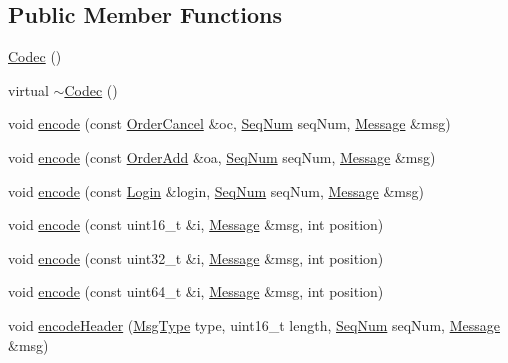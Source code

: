 \subsection*{Public Member Functions}
\begin{DoxyCompactItemize}
\item 
\hyperlink{classMetal_1_1Aquis_1_1Codec_ab68190600daa2d1b8105e6d8ff83afd6}{Codec} ()
\item 
virtual \hyperlink{classMetal_1_1Aquis_1_1Codec_a7bdeb61cbb583a2a77476cd7b196c0c2}{$\sim$\+Codec} ()
\item 
void \hyperlink{classMetal_1_1Aquis_1_1Codec_a361dc20ec705f056891468c8b0312699}{encode} (const \hyperlink{classMetal_1_1Aquis_1_1OrderCancel}{Order\+Cancel} \&oc, \hyperlink{namespaceMetal_1_1Aquis_a2e28795915a9bf76ccc4574a24376487}{Seq\+Num} seq\+Num, \hyperlink{classMetal_1_1Message}{Message} \&msg)
\item 
void \hyperlink{classMetal_1_1Aquis_1_1Codec_aaf73f35bd28f5f59ac6b2a968354bb91}{encode} (const \hyperlink{classMetal_1_1Aquis_1_1OrderAdd}{Order\+Add} \&oa, \hyperlink{namespaceMetal_1_1Aquis_a2e28795915a9bf76ccc4574a24376487}{Seq\+Num} seq\+Num, \hyperlink{classMetal_1_1Message}{Message} \&msg)
\item 
void \hyperlink{classMetal_1_1Aquis_1_1Codec_a1162f3fd1a0f6351dba465a23af0f114}{encode} (const \hyperlink{classMetal_1_1Aquis_1_1Login}{Login} \&login, \hyperlink{namespaceMetal_1_1Aquis_a2e28795915a9bf76ccc4574a24376487}{Seq\+Num} seq\+Num, \hyperlink{classMetal_1_1Message}{Message} \&msg)
\item 
void \hyperlink{classMetal_1_1Aquis_1_1Codec_a8aa920b8a5422358a2529056e36094d7}{encode} (const uint16\+\_\+t \&i, \hyperlink{classMetal_1_1Message}{Message} \&msg, int position)
\item 
void \hyperlink{classMetal_1_1Aquis_1_1Codec_a82ef20e51a8850db3213c60a9348b59e}{encode} (const uint32\+\_\+t \&i, \hyperlink{classMetal_1_1Message}{Message} \&msg, int position)
\item 
void \hyperlink{classMetal_1_1Aquis_1_1Codec_abd44b89febe2913fbe8505653ce17cb4}{encode} (const uint64\+\_\+t \&i, \hyperlink{classMetal_1_1Message}{Message} \&msg, int position)
\item 
void \hyperlink{classMetal_1_1Aquis_1_1Codec_ae0e2296c1a295fa7f6000e94d8cc7f13}{encode\+Header} (\hyperlink{namespaceMetal_1_1Aquis_ac6c095b7eefa1d7918de0fe9387f3786}{Msg\+Type} type, uint16\+\_\+t length, \hyperlink{namespaceMetal_1_1Aquis_a2e28795915a9bf76ccc4574a24376487}{Seq\+Num} seq\+Num, \hyperlink{classMetal_1_1Message}{Message} \&msg)
\end{DoxyCompactItemize}
